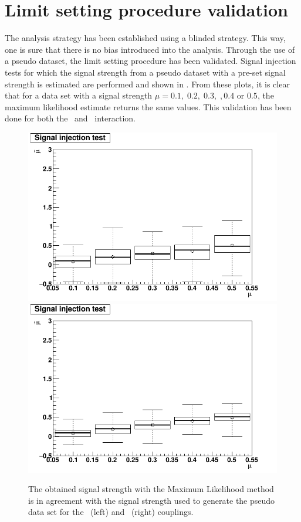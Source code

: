 \section{Limit setting procedure validation}
\label{sec:val}
The analysis strategy has been established using a blinded strategy. This way, one is sure that there is no bias introduced into the analysis. Through the use of a pseudo dataset, the limit setting procedure has been validated. Signal injection tests for which the signal strength from a pseudo dataset with a pre-set  signal strength is estimated are performed and shown in . From these plots, it is clear that for a data set with a signal strength $\mu= 0.1,\;0.2,\;0.3,\;,0.4$ or $0.5$, the maximum likelihood estimate returns the same values. This validation has been done for both the \Zut\ and \Zct\ interaction.
\begin{figure}[htbp]
	\centering
	 \includegraphics[width=0.49\linewidth]{6_Search/Figures/SignalInjection/plotZut}
	 \includegraphics[width=0.49\linewidth]{6_Search/Figures/SignalInjection/plotZct}
	\caption{The  obtained signal strength with the Maximum Likelihood method is in agreement with the signal strength used to generate the pseudo data set for the \Zut\ (left) and \Zct\ (right) couplings.}
	\label{fig:plotzut}
\end{figure}

